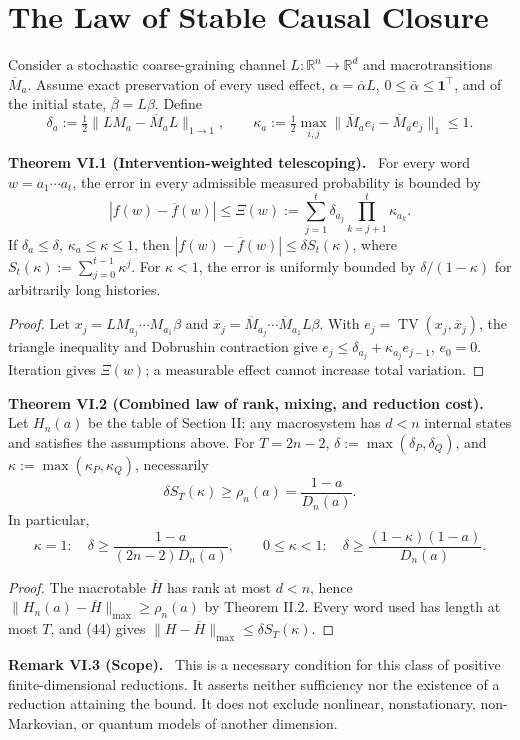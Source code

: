 \documentclass[11pt,a4paper,oneside]{book}
\newcommand{\R}{\mathbb R}\newcommand{\C}{\mathbb C}\newcommand{\Z}{\mathbb Z}\newcommand{\N}{\mathbb N}\newcommand{\Q}{\mathbb Q}
\newcommand{\one}{\mathbf 1}\newcommand{\ii}{\mathrm i}\newcommand{\dd}{\mathrm d}
\newcommand{\statement}[3]{\par\medskip\noindent\textbf{#1 #2 (#3).}\ }
\begin{document}
\chapter{The Law of Stable Causal Closure}
Consider a stochastic coarse-graining channel $L:\R^n\to\R^d$ and macrotransitions $\overline M_a$. Assume exact preservation of every used effect, $\alpha=\overline\alpha L$, $0\le\overline\alpha\le\one^\top$, and of the initial state, $\overline\beta=L\beta$. Define
\[\delta_a:=\tfrac12\|LM_a-\overline M_aL\|_{1\to1},\qquad\kappa_a:=\tfrac12\max_{i,j}\|\overline M_ae_i-\overline M_ae_j\|_1\le1.\]
\statement{Theorem}{VI.1}{Intervention-weighted telescoping} For every word $w=a_1\cdots a_t$, the error in every admissible measured probability is bounded by
\begin{equation}|f(w)-\overline f(w)|\le\Xi(w):=\sum_{j=1}^t\delta_{a_j}\prod_{k=j+1}^t\kappa_{a_k}.\tag{44}\end{equation}
If $\delta_a\le\delta$, $\kappa_a\le\kappa\le1$, then $|f(w)-\overline f(w)|\le\delta S_t(\kappa)$, where $S_t(\kappa):=\sum_{j=0}^{t-1}\kappa^j$. For $\kappa<1$, the error is uniformly bounded by $\delta/(1-\kappa)$ for arbitrarily long histories.
\begin{proof}Let $x_j=LM_{a_j}\cdots M_{a_1}\beta$ and $\overline x_j=\overline M_{a_j}\cdots\overline M_{a_1}L\beta$. With $e_j=\operatorname{TV}(x_j,\overline x_j)$, the triangle inequality and Dobrushin contraction give $e_j\le\delta_{a_j}+\kappa_{a_j}e_{j-1}$, $e_0=0$. Iteration gives $\Xi(w)$; a measurable effect cannot increase total variation.\end{proof}
\statement{Theorem}{VI.2}{Combined law of rank, mixing, and reduction cost} Let $H_n(a)$ be the table of Section II; any macrosystem has $d<n$ internal states and satisfies the assumptions above. For $T=2n-2$, $\delta:=\max(\delta_P,\delta_Q)$, and $\kappa:=\max(\kappa_P,\kappa_Q)$, necessarily
\begin{equation}\delta S_T(\kappa)\ge\rho_n(a)=\frac{1-a}{D_n(a)}.\tag{45}\end{equation}
In particular,
\[\kappa=1:\quad\delta\ge\frac{1-a}{(2n-2)D_n(a)},\qquad0\le\kappa<1:\quad\delta\ge\frac{(1-\kappa)(1-a)}{D_n(a)}.\]
\begin{proof}The macrotable $\overline H$ has rank at most $d<n$, hence $\|H_n(a)-\overline H\|_{\max}\ge\rho_n(a)$ by Theorem II.2. Every word used has length at most $T$, and (44) gives $\|H-\overline H\|_{\max}\le\delta S_T(\kappa)$.\end{proof}
\statement{Remark}{VI.3}{Scope} This is a necessary condition for this class of positive finite-dimensional reductions. It asserts neither sufficiency nor the existence of a reduction attaining the bound. It does not exclude nonlinear, nonstationary, non-Markovian, or quantum models of another dimension.
\end{document}
